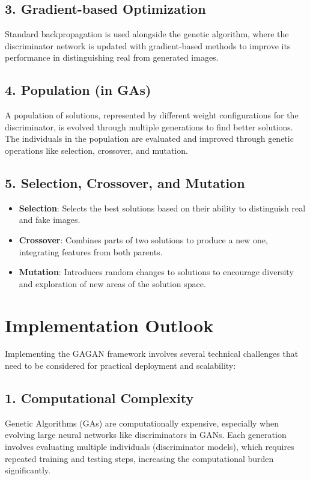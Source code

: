\documentclass[a4paper,12pt]{article}
\begin{document}
\subsection*{3. Gradient-based Optimization}
Standard backpropagation is used alongside the genetic algorithm, where the discriminator network is updated with gradient-based methods to improve its performance in distinguishing real from generated images.

\subsection*{4. Population (in GAs)}
A population of solutions, represented by different weight configurations for the discriminator, is evolved through multiple generations to find better solutions. The individuals in the population are evaluated and improved through genetic operations like selection, crossover, and mutation.

\subsection*{5. Selection, Crossover, and Mutation}
\begin{itemize}
    \item \textbf{Selection}: Selects the best solutions based on their ability to distinguish real and fake images.
    \item \textbf{Crossover}: Combines parts of two solutions to produce a new one, integrating features from both parents.
    \item \textbf{Mutation}: Introduces random changes to solutions to encourage diversity and exploration of new areas of the solution space.
\end{itemize}

\section*{Implementation Outlook}
Implementing the GAGAN framework involves several technical challenges that need to be considered for practical deployment and scalability:

\subsection*{1. Computational Complexity}
Genetic Algorithms (GAs) are computationally expensive, especially when evolving large neural networks like discriminators in GANs. Each generation involves evaluating multiple individuals (discriminator models), which requires repeated training and testing steps, increasing the computational burden significantly.
\end{document}
